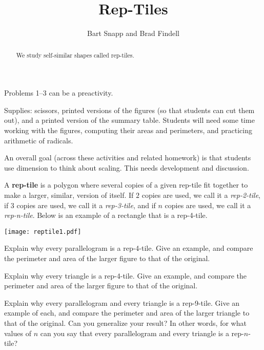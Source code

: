 \documentclass[nooutcomes]{ximera}
\title{Rep-Tiles}
\author{Bart Snapp and Brad Findell}
\begin{document}
\begin{abstract}
  We study self-similar shapes called rep-tiles.
\end{abstract}
\maketitle

\begin{teachingnote}
Problems 1--3 can be a preactivity.  

Supplies: scissors, printed versions of the figures (so that students can cut them out), and a printed version of the summary table.   Students will need some time working with the figures, computing their areas and perimeters, and practicing arithmetic of radicals.   

An overall goal (across these activities and related homework) is that students use dimension to think about scaling. This needs development and discussion.  
\end{teachingnote}

A \textbf{rep-tile} is a polygon where several copies of
a given rep-tile fit together to make a larger, similar, version of
itself. If $2$ copies are used, we call it a \textit{rep-2-tile}, if
$3$ copies are used, we call it a \textit{rep-3-tile}, and if $n$ copies
are used, we call it a \textit{rep-n-tile}.  Below is an example of a rectangle 
that is a rep-4-tile.
\begin{image}
\texttt{[image: reptile1.pdf]}
\end{image}
\begin{problem}
Explain why every parallelogram is a rep-4-tile. Give an example, and compare the perimeter and area of the larger figure to that of the original.
\end{problem}

\begin{problem}
Explain why every triangle is a rep-4-tile. Give an example, and compare the perimeter and area of the larger figure to that of the
original.
\end{problem}

\begin{problem}
Explain why every parallelogram and every triangle is a rep-9-tile. Give an example of each, and compare the perimeter and area of the larger triangle to that of the original. Can you generalize your result?  In other words, for what values of $n$ can you say that every parallelogram and every triangle is a rep-$n$-tile?  
\end{problem}
\end{document}
